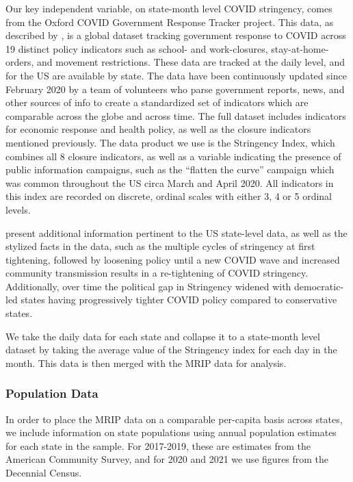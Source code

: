 \documentclass[12pt]{article}
\begin{document}
Our key independent variable, on state-month level COVID stringency,
comes from the Oxford COVID Government Response Tracker project. This
data, as described by \citet{hale2021global}, is a global dataset tracking
government response to COVID across 19 distinct policy indicators such
as school- and work-closures, stay-at-home-orders, and movement
restrictions. These data are tracked at the daily level, and for the US
are available by state. The data have been continuously updated since
February 2020 by a team of volunteers who parse government reports,
news, and other sources of info to create a standardized set of
indicators which are comparable across the globe and across time. The
full dataset includes indicators for economic response and health
policy, as well as the closure indicators mentioned previously. The data
product we use is the Stringency Index, which combines all 8 closure
indicators, as well as a variable indicating the presence of public
information campaigns, such as the ``flatten the curve'' campaign which
was common throughout the US circa March and April 2020. All indicators
in this index are recorded on discrete, ordinal scales with either 3, 4
or 5 ordinal levels.

\citet{hallas2021Variation} present additional information pertinent to the US
state-level data, as well as the stylized facts in the data, such as the
multiple cycles of stringency at first tightening, followed by loosening
policy until a new COVID wave and increased community transmission
results in a re-tightening of COVID stringency. Additionally, over time
the political gap in Stringency widened with democratic-led states
having progressively tighter COVID policy compared to conservative
states.

We take the daily data for each state and collapse it to a state-month
level dataset by taking the average value of the Stringency index for
each day in the month. This data is then merged with the MRIP data for
analysis.

\subsubsection{Population Data}

In order to place the MRIP data on a comparable per-capita basis across
states, we include information on state populations using annual
population estimates for each state in the sample. For 2017-2019, these
are estimates from the American Community Survey, and for 2020 and 2021
we use figures from the Decennial Census.
\end{document}
